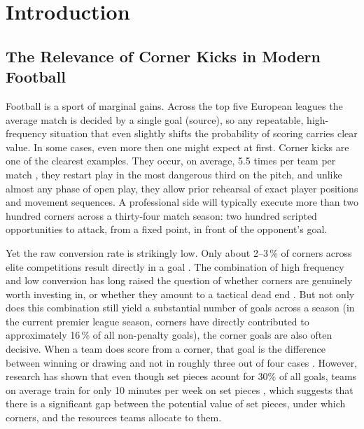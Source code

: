 
\chapter{Introduction}
\label{chap:introduction}

\section{The Relevance of Corner Kicks in Modern Football}
\label{sec:intro_relevance}

Football is a sport of marginal gains. Across the top five European leagues
the average match is decided by a single goal (source), so any repeatable, high-frequency
situation that even slightly shifts the probability of scoring carries clear value. In some cases, even more then one
might expect at first. Corner kicks are one
of the clearest examples. They
occur, on average, 5.5 times per team per match \citep{Casal2015}, they restart
play in the most dangerous third on the pitch, and unlike almost any
phase of open play, they allow prior rehearsal of exact player positions and
movement sequences. A professional side will typically execute more than two
hundred corners across a thirty-four match season: two hundred scripted
opportunities to attack, from a fixed point, in front of the opponent's goal.

Yet the raw conversion rate is strikingly low. Only about 2--3\,\% of corners
across elite competitions result directly in a goal \citep{Casal2015,
ShawGopaladesikan2020}. The combination of high frequency and low conversion has long raised the
question of whether corners are genuinely worth investing in, or whether they
amount to a tactical dead end \citep{Power2018}. But not only does this combination still yield 
a substantial number of goals across a season (in the current premier league season, 
corners have directly contributed to approximately 16\,\% of all non-penalty goals), the 
corner goals are also often decisive. When a team does score from a
corner, that goal is the difference between winning or drawing and not in
roughly three out of four cases \citep{Casal2015}. However, research has shown that even
though set pieces acount for 30\% of all goals, teams on average train for only 10 minutes
per week on set pieces \citep{giovanni_vio_2024}, which suggests that there is a significant 
gap between the potential value of set pieces, under which corners, and the resources teams
 allocate to them.

